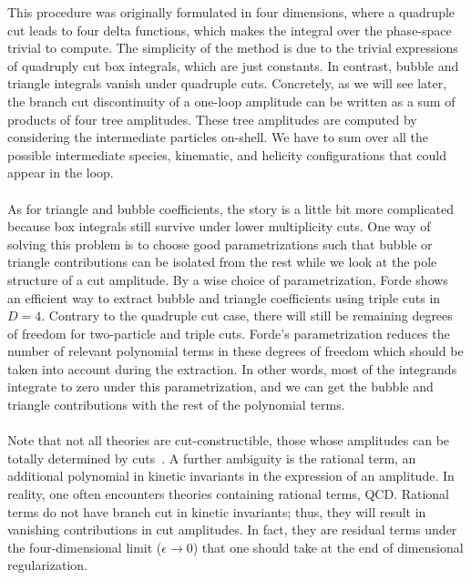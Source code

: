 This procedure was originally formulated in four dimensions, where a quadruple cut leads to four delta functions, which makes the integral over the phase-space trivial to compute. 
The simplicity of the method is due to the trivial expressions of quadruply cut box integrals, which are just constants.
In contrast, bubble and triangle integrals vanish under quadruple cuts.
Concretely, as we will see later, the branch cut discontinuity of a one-loop amplitude can be written as a sum of products of four tree amplitudes.
These tree amplitudes are computed by considering the intermediate particles on-shell.
We have to sum over all the possible intermediate species, kinematic, and helicity configurations that could appear in the loop.
\\\\
As for triangle and bubble coefficients, the story is a little bit more complicated because box integrals still survive under lower multiplicity cuts.
One way of solving this problem is to choose good parametrizations such that bubble or triangle contributions can be isolated from the rest while we look at the pole structure of a cut amplitude.
By a wise choice of parametrization, Forde shows~\cite{Forde:2007mi} an efficient way to extract bubble and triangle coefficients using triple cuts in $D=4$.
Contrary to the quadruple cut case, there will still be remaining degrees of freedom for two-particle and triple cuts. 
Forde's parametrization reduces the number of relevant polynomial terms in these degrees of freedom which should be taken into account during the extraction. 
In other words, most of the integrands integrate to zero under this parametrization, and we can get the bubble and triangle contributions with the rest of the polynomial terms.
\\\\
Note that not all theories are cut-constructible, \ie those whose amplitudes can be totally determined by cuts~\cite{Bern:1994cg}. 
A further ambiguity is the rational term, \ie an additional polynomial in kinetic invariants in the expression of an amplitude. 
In reality, one often encounters theories containing rational terms, \eg QCD.
Rational terms do not have branch cut in kinetic invariants; thus, they will result in vanishing contributions in cut amplitudes.
In fact, they are residual terms under the four-dimensional limit ($\epsilon\rightarrow 0$) that one should take at the end of dimensional regularization.
%
